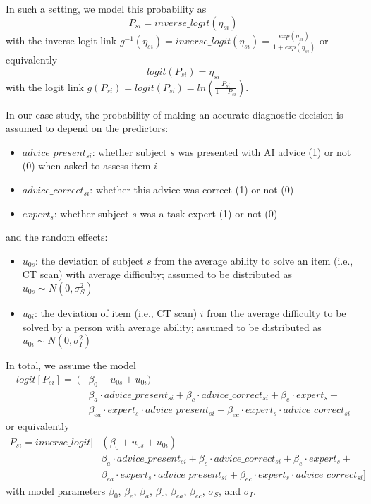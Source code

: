 \documentclass[
  man,floatsintext]{apa6}
\providecommand{\tightlist}{%
  \setlength{\itemsep}{0pt}\setlength{\parskip}{0pt}}
\begin{document}
In such a setting, we model this probability as \[
P_{si} = inverse\_logit(\eta_{si})
\] with the inverse-logit link \(g^{-1}(\eta_{si}) = inverse\_logit(\eta_{si}) = \frac{exp(\eta_{si})}{1 + exp(\eta_{si})}\) or equivalently \[
logit(P_{si}) = \eta_{si}
\] with the logit link \(g(P_{si}) = logit(P_{si}) = ln (\frac{P_{si}}{1 - P_{si}})\).

In our case study, the probability of making an accurate diagnostic decision is assumed to depend on the predictors:

\begin{itemize}
\tightlist
\item
  \(advice\_present_{si}\): whether subject \(s\) was presented with AI advice (1) or not (0) when asked to assess item \(i\)
\item
  \(advice\_correct_{si}\): whether this advice was correct (1) or not (0)
\item
  \(expert_s\): whether subject \(s\) was a task expert (1) or not (0)
\end{itemize}

and the random effects:

\begin{itemize}
\tightlist
\item
  \(u_{0s}\): the deviation of subject \(s\) from the average ability to solve an item (i.e., CT scan) with average difficulty; assumed to be distributed as \(u_{0s} \sim N(0, \sigma_S^2)\)
\item
  \(u_{0i}\): the deviation of item (i.e., CT scan) \(i\) from the average difficulty to be solved by a person with average ability; assumed to be distributed as \(u_{0i} \sim N(0, \sigma_I^2)\)
\end{itemize}

In total, we assume the model \[
\begin{aligned}
logit[P_{si}] =\ (&\beta_0 + u_{0s} + u_{0i}) + \\
&\beta_a \cdot advice\_present_{si} + \beta_c \cdot advice\_correct_{si} + \beta_e \cdot expert_s + \\
&\beta_{ea} \cdot expert_{s} \cdot advice\_present_{si} + \beta_{ec} \cdot expert_{s} \cdot advice\_correct_{si}
\end{aligned}
\] or equivalently \[
\begin{aligned}
P_{si} = inverse\_logit[&(\beta_0 + u_{0s} + u_{0i}) + \\
&\beta_a \cdot advice\_present_{si} + \beta_c \cdot advice\_correct_{si} + \beta_e \cdot expert_s + \\
&\beta_{ea} \cdot expert_{s} \cdot advice\_present_{si} + \beta_{ec} \cdot expert_{s} \cdot advice\_correct_{si}]
\end{aligned}
\] with model parameters \(\beta_0\), \(\beta_e\), \(\beta_a\), \(\beta_c\), \(\beta_{ea}\), \(\beta_{ec}\), \(\sigma_S\), and \(\sigma_I\).
\end{document}
